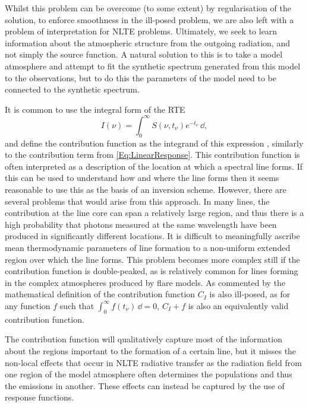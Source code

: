 Whilst this problem can be overcome (to some extent) by regularisation of the solution, to enforce smoothness in the ill-posed problem, we are also left with a problem of interpretation for NLTE problems.
Ultimately, we seek to learn information about the atmospheric structure from the outgoing radiation, and not simply the source function.
A natural solution to this is to take a model atmosphere and attempt to fit the synthetic spectrum generated from this model to the observations, but to do this the parameters of the model need to be connected to the synthetic spectrum.


It is common to use the integral form of the RTE
\begin{equation}
    I(\nu) = \int_0^\infty S(\nu, t_\nu) e^{-t_\nu} \mathop{\dd{}t_\nu},
\end{equation}
and define the contribution function as the integrand of this expression \citep{Carlsson1997,DelToroIniesta2003}, similarly to the contribution term from \eqref{Eq:LinearResponse}.
This contribution function is often interpreted as a description of the location at which a spectral line forms.
If this can be used to understand how and where the line forms then it seems reasonable to use this as the basis of an inversion scheme.
However, there are several problems that would arise from this approach.
In many lines, the contribution at the line core can span a relatively large region, and thus there is a high probability that photons measured at the same wavelength have been produced in significantly different locations.
It is difficult to meaningfully ascribe mean thermodynamic parameters of line formation to a non-uniform extended region over which the line forms.
This problem becomes more complex still if the contribution function is double-peaked, as is relatively common for lines forming in the complex atmospheres produced by flare models.
As commented by \citet{DelToroIniesta2003} the mathematical definition of the contribution function $C_I$ is also ill-posed, as for any function $f$ such that $\int_0^\infty f(t_\nu) \mathop{\dd{}t_\nu} = 0$, $C_I + f$ is also an equivalently valid contribution function.

The contribution function will qualitatively capture most of the information about the regions important to the formation of a certain line, but it misses the non-local effects that occur in NLTE radiative transfer as the radiation field from one region of the model atmosphere often determines the populations and thus the emissions in another.
These effects can instead be captured by the use of response functions.

